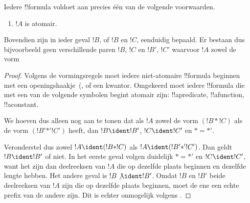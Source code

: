 \documentclass[../../../include/open-logic-section]{subfiles}
\begin{document}
\begin{prop}
Iedere !!{formula} voldoet aan precies één van de volgende voorwaarden.
\begin{enumerate}
\item $!A$ is atomair.







\end{enumerate}
Bovendien zijn in ieder geval $!B$, of $!B$ en $!C$, eenduidig
bepaald. Er bestaan dus bijvoorbeeld geen verschillende paren $!B$,
$!C$ en $!B'$, $!C'$ waarvoor $!A$ zowel de vorm
\end{prop}

\begin{proof}
Volgens de vormingsregels moet iedere niet-atomaire !!{formula}
beginnen met een openingshaakje~(,  of een
kwantor. Omgekeerd moet iedere !!{formula} die met een van de volgende
symbolen begint atomair zijn: !!a{predicate}, !!a{function},
!!a{constant}.

We hoeven dus alleen nog aan te tonen dat als $!A$ zowel de vorm $(!B
\ast !C)$ als de vorm $(!B' \mathbin{\ast'} !C')$ heeft, dan $!B
\ident !B'$, $!C \ident !C'$ en $\ast = {\ast'}$.

Veronderstel dus zowel $!A \ident (!B \ast !C)$ als $!A \ident (!B'
\mathbin{\ast'} !C')$. Dan geldt $!B \ident !B'$ of niet. In het eerste
geval volgen duidelijk $\ast = {\ast'}$ en $!C \ident !C'$, want het
zijn dan deelreeksen van $!A$ die op dezelfde plaats beginnen en
dezelfde lengte hebben. Het andere geval is $!B \not\ident !B'$. Omdat
$!B$ en $!B'$ beide deelreeksen van $!A$ zijn die op dezelfde plaats
beginnen, moet de ene een echte prefix van de andere zijn. Dit is
echter onmogelijk volgens .
\end{proof}
\end{document}
